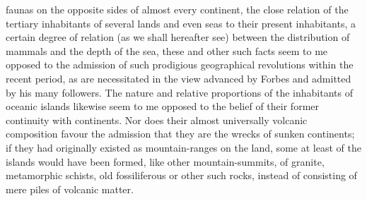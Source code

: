 faunas on the opposite sides of almost every continent, the close relation of the tertiary inhabitants of several lands and even seas to their present inhabitants, a certain degree of relation (as we shall hereafter see) between the distribution of mammals and the depth of the sea, these and other such facts seem to me opposed to the admission of such prodigious geographical revolutions within the recent period, as are necessitated in the view advanced by Forbes and admitted by his many followers. The nature and relative proportions of the inhabitants of oceanic islands likewise seem to me opposed to the belief of their former continuity with continents.  Nor does their almost universally volcanic composition favour the admission that they are the wrecks of sunken continents; if they had originally existed as mountain-ranges on the land, some at least of the islands would have been formed, like other mountain-summits, of granite, metamorphic schists, old fossiliferous or other such rocks, instead of consisting of mere piles of volcanic matter.~\\
